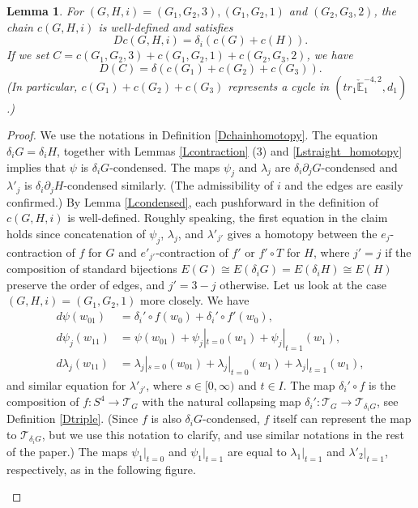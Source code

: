 \documentclass[reqno]{amsart}
\theoremstyle{definition}
\theoremstyle{plain}
\newtheorem{lem}[defi]{Lemma}
\newcommand{\TT}{\mathcal{T}} %
\newcommand{\CEE}{\check{\mathbb{E}}}
\begin{document}
\begin{lem}\label{Lh_i_welldef}
For $(G,H,i)=(G_1,G_2,3), (G_1,G_2,1)$ and $(G_2,G_3,2)$, the chain $c(G,H,i)$ is well-defined and satisfies 
\[
Dc(G,H,i)=\delta_i(c(G)+c(H)).
\] If we set $C=c(G_1,G_2,3)+c(G_1,G_2,1)+c(G_2,G_3,2)$, we have
\[
D(C)=\delta(c(G_1)+c(G_2)+c(G_3)).
\]
(In particular, $c(G_1)+c(G_2)+c(G_3)$ represents a cycle in $(tr_1\CEE^{-4,2}_1,d_1)$.)
\end{lem}
\begin{proof}
We use the notations in Definition \ref{Dchainhomotopy}.  The equation $\delta_iG=\delta_iH$, together with Lemmas \ref{Lcontraction} (3) and   \ref{Lstraight_homotopy} implies that $\psi$ is $\delta_iG$-condensed. The maps $\psi_j$ and  $\lambda_j$ are $\delta_i\partial_jG$-condensed and  $\lambda'_j$ is $\delta_i\partial_jH$-condensed similarly. (The admissibility of $i$ and the edges are easily confirmed.) By Lemma \ref{Lcondensed}, each pushforward in the definition of $c(G,H,i)$ is well-defined. 
Roughly speaking, the first equation in the claim holds since concatenation of $\psi_j$, $\lambda_j$, and $\lambda'_{j'}$ gives a homotopy between the $e_j$-contraction of $f$ for $G$ and $e'_{j'}$-contraction of $f'$ or $f'\circ T$ for $H$, where $j'=j$ if the composition of standard bijections $E(G)\cong E(\delta_iG)=E(\delta_iH)\cong E(H)$  preserve the order of edges, and $j'=3-j$ otherwise. Let us look at the case $(G,H,i)=(G_1,G_2,1)$ more closely. We have
\[
\begin{split}
d\psi(w_{01})&=\delta_i'\circ f(w_0)+\delta_i'\circ f'(w_0),\\
d\psi_j(w_{11})&=\psi(w_{01})+\psi_j|_{t=0}(w_1)+\psi_j|_{t=1}(w_1), \\
d\lambda_j(w_{11})&=\lambda_j|_{s=0}(w_{01})+\lambda_j|_{t=0}(w_1)+\lambda_j|_{t=1}(w_1),
\end{split}
\]
and similar equation for  $\lambda'_{j'}$, where $s\in [0,\infty)$ and $t\in I$. The map $\delta_i'\circ f$ is the composition of  $f:S^4\to \TT_G$ with the natural collapsing map $\delta_i':\TT_G\to\TT_{\delta_iG}$, see Definition \ref{Dtriple}. (Since $f$ is also $\delta_iG$-condensed, $f$ itself can represent the map to $\TT_{\delta_iG}$, but we use this notation to clarify, and use similar notations in the rest of the paper.) The maps $\psi_1|_{t=0}$ and $\psi_1|_{t=1}$ are equal to $\lambda_1|_{t=1}$ and $\lambda'_2|_{t=1}$, respectively, as in the following figure.
\begin{figure}[H]
\begin{center}
\phantom{aaaaaaa}

\end{center}
\end{figure}
\end{proof}
\end{document}

